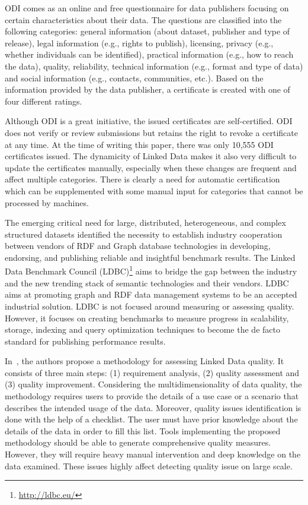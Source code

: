 \documentclass[onecolumn, crcready]{../../Util/LaTEX/iosart2c}
\begin{document}
ODI comes as an online and free questionnaire for data publishers focusing on certain characteristics about their data. The questions are classified into the following categories: general information (about dataset, publisher and type of release), legal information (e.g., rights to publish), licensing, privacy (e.g., whether individuals can be identified), practical information (e.g., how to reach the data), quality, reliability, technical information (e.g., format and type of data) and social information (e.g., contacts, communities, etc.). Based on the information provided  by the data  publisher, a certificate is created with one of four different ratings.

Although ODI is a great initiative, the issued certificates are self-certified. ODI does not verify or review submissions but retains the right to revoke a certificate at any time. At the time of writing this paper, there was only 10,555 ODI certificates issued. The dynamicity of Linked Data  makes it also very difficult to update the certificates manually, especially when these changes are frequent and affect multiple categories. There is clearly a need for automatic certification which can be supplemented with some manual input for categories that cannot be processed by machines.

The emerging critical need for large, distributed, heterogeneous, and complex structured datasets identified the necessity to establish industry cooperation between vendors of RDF and Graph database technologies in developing, endorsing, and publishing reliable and insightful benchmark results. The Linked Data Benchmark Council (LDBC)\footnote{\url{http://ldbc.eu/}} aims to bridge the gap between the industry and the new trending stack of semantic technologies and their vendors. LDBC aims at promoting graph and RDF data management systems to be an accepted industrial solution. LDBC is not focused around measuring or assessing quality. However, it focuses on creating benchmarks to measure progress in scalability, storage, indexing and query optimization techniques to become the de facto standard for publishing performance results.

In~\cite{Anisa:LDQ:14}, the authors propose a methodology for assessing Linked Data quality. It consists of three main steps: (1) requirement analysis, (2) quality assessment and (3) quality improvement. Considering the multidimensionality of data quality, the methodology requires users to provide the details of a use case or a scenario that describes the intended usage of the data. Moreover, quality issues identification is done with the help of a checklist. The user must have prior knowledge about the details of the data in order to fill this list. Tools implementing the proposed methodology should be able to generate comprehensive quality measures. However, they will require heavy manual intervention and deep knowledge on the data examined. These issues highly affect detecting quality issue on large scale.
\end{document}

